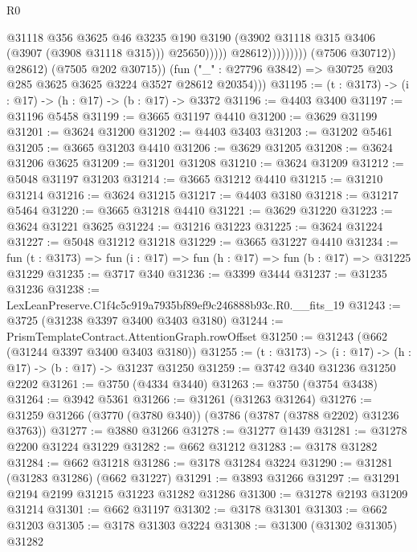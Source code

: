 \begin{lexlean}{R0}
\begin{coremodule}
                                          @31118
                                          @356
                                          @3625
                                          @46
                                          @3235
                                          @190
                                          @3190
                                          (@3902 @31118 @315 @3406 (@3907 (@3908 @31118 @315)))
                                          @25650)))))
                                @28612)))))))))
              (@7506 @30712))
            @28612)
          (@7505 @202 @30715))
        (fun ("_" : @27796 @3842) => @30725 @203 @285 @3625 @3625 @3224 @3527 @28612 @20354)))
@31195 := (t : @3173) -> (i : @17) -> (h : @17) -> (b : @17) -> @3372
@31196 := @4403 @3400
@31197 := @31196 @5458
@31199 := @3665 @31197 @4410
@31200 := @3629 @31199
@31201 := @3624 @31200
@31202 := @4403 @3403
@31203 := @31202 @5461
@31205 := @3665 @31203 @4410
@31206 := @3629 @31205
@31208 := @3624 @31206 @3625
@31209 := @31201 @31208
@31210 := @3624 @31209
@31212 := @5048 @31197 @31203
@31214 := @3665 @31212 @4410
@31215 := @31210 @31214
@31216 := @3624 @31215
@31217 := @4403 @3180
@31218 := @31217 @5464
@31220 := @3665 @31218 @4410
@31221 := @3629 @31220
@31223 := @3624 @31221 @3625
@31224 := @31216 @31223
@31225 := @3624 @31224
@31227 := @5048 @31212 @31218
@31229 := @3665 @31227 @4410
@31234 := fun (t : @3173) => fun (i : @17) => fun (h : @17) => fun (b : @17) => @31225 @31229
@31235 := @3717 @340
@31236 := @3399 @3444
@31237 := @31235 @31236
@31238 := LexLeanPreserve.C1f4c5c919a7935bf89ef9c246888b93c.R0.__fits_19
@31243 := @3725 (@31238 @3397 @3400 @3403 @3180)
@31244 := PrismTemplateContract.AttentionGraph.rowOffset
@31250 := @31243 (@662 (@31244 @3397 @3400 @3403 @3180))
@31255 := (t : @3173) -> (i : @17) -> (h : @17) -> (b : @17) -> @31237 @31250
@31259 := @3742 @340 @31236 @31250 @2202
@31261 := @3750 (@4334 @3440)
@31263 := @3750 (@3754 @3438)
@31264 := @3942 @5361
@31266 := @31261 (@31263 @31264)
@31276 := @31259 @31266 (@3770 (@3780 @340)) (@3786 (@3787 (@3788 @2202) @31236 @3763))
@31277 := @3880 @31266
@31278 := @31277 @1439
@31281 := @31278 @2200 @31224 @31229
@31282 := @662 @31212
@31283 := @3178 @31282
@31284 := @662 @31218
@31286 := @3178 @31284 @3224
@31290 := @31281 (@31283 @31286) (@662 @31227)
@31291 := @3893 @31266
@31297 := @31291 @2194 @2199 @31215 @31223 @31282 @31286
@31300 := @31278 @2193 @31209 @31214
@31301 := @662 @31197
@31302 := @3178 @31301
@31303 := @662 @31203
@31305 := @3178 @31303 @3224
@31308 := @31300 (@31302 @31305) @31282

\end{coremodule}
\end{lexlean}
